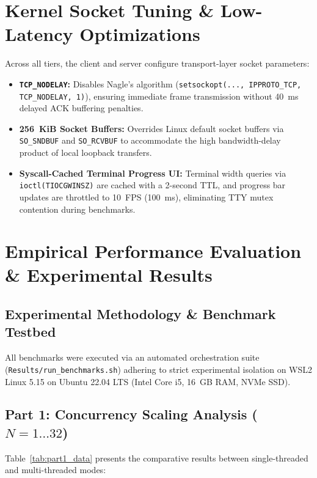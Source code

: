 \documentclass[11pt,a4paper]{article}
\begin{document}
\section{Kernel Socket Tuning \& Low-Latency Optimizations}

Across all tiers, the client and server configure transport-layer socket parameters:
\begin{itemize}[leftmargin=*]
    \item \textbf{\texttt{TCP\_NODELAY}:} Disables Nagle's algorithm (\texttt{setsockopt(..., IPPROTO\_TCP, TCP\_NODELAY, 1)}), ensuring immediate frame transmission without 40~ms delayed ACK buffering penalties.
    \item \textbf{256~KiB Socket Buffers:} Overrides Linux default socket buffers via \texttt{SO\_SNDBUF} and \texttt{SO\_RCVBUF} to accommodate the high bandwidth-delay product of local loopback transfers.
    \item \textbf{Syscall-Cached Terminal Progress UI:} Terminal width queries via \texttt{ioctl(TIOCGWINSZ)} are cached with a 2-second TTL, and progress bar updates are throttled to 10~FPS (100~ms), eliminating TTY mutex contention during benchmarks.
\end{itemize}

\section{Empirical Performance Evaluation \& Experimental Results}

\subsection{Experimental Methodology \& Benchmark Testbed}
All benchmarks were executed via an automated orchestration suite (\texttt{Results/run\_benchmarks.sh}) adhering to strict experimental isolation on WSL2 Linux 5.15 on Ubuntu 22.04 LTS (Intel Core i5, 16~GB RAM, NVMe SSD).

\subsection{Part 1: Concurrency Scaling Analysis ($N = 1 \dots 32$)}
Table~\ref{tab:part1_data} presents the comparative results between single-threaded and multi-threaded modes:
\end{document}
